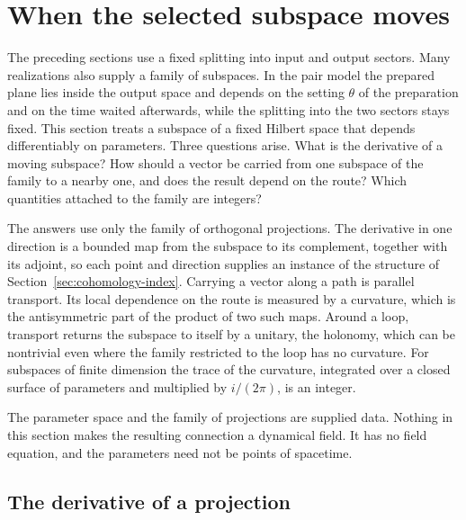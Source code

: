 \documentclass[11pt]{article}
\theoremstyle{definition}
\begin{document}
\section{When the selected subspace moves}
\label{sec:moving-subspace}

The preceding sections use a fixed splitting into input and output sectors. Many realizations also supply a family of subspaces. In the pair model the prepared plane lies inside the output space and depends on the setting $\theta$ of the preparation and on the time waited afterwards, while the splitting into the two sectors stays fixed. This section treats a subspace of a fixed Hilbert space that depends differentiably on parameters. Three questions arise. What is the derivative of a moving subspace? How should a vector be carried from one subspace of the family to a nearby one, and does the result depend on the route? Which quantities attached to the family are integers?

The answers use only the family of orthogonal projections. The derivative in one direction is a bounded map from the subspace to its complement, together with its adjoint, so each point and direction supplies an instance of the structure of Section~\ref{sec:cohomology-index}. Carrying a vector along a path is parallel transport. Its local dependence on the route is measured by a curvature, which is the antisymmetric part of the product of two such maps. Around a loop, transport returns the subspace to itself by a unitary, the holonomy, which can be nontrivial even where the family restricted to the loop has no curvature. For subspaces of finite dimension the trace of the curvature, integrated over a closed surface of parameters and multiplied by $i/(2\pi)$, is an integer.

The parameter space and the family of projections are supplied data. Nothing in this section makes the resulting connection a dynamical field. It has no field equation, and the parameters need not be points of spacetime.

\subsection{The derivative of a projection}
\label{subsec:moving-derivative}
\end{document}
